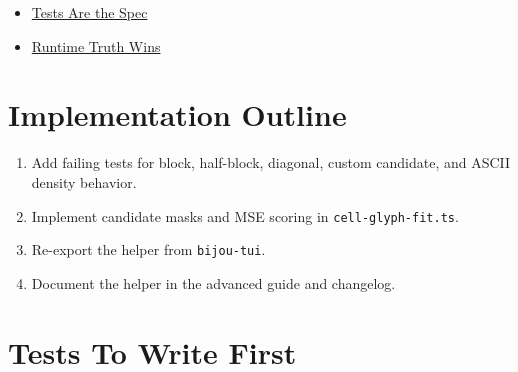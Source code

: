 \begin{itemize}
\tightlist
\item
  \href{https://github.com/flyingrobots/bijou/blob/cbd70612140e7a450d764b3c7be1c6af878b99bc/docs/invariants/tests-are-the-spec.md}{Tests Are the Spec}
\item
  \href{https://github.com/flyingrobots/bijou/blob/cbd70612140e7a450d764b3c7be1c6af878b99bc/docs/invariants/runtime-truth-wins.md}{Runtime Truth Wins}
\end{itemize}

\section{Implementation Outline}\label{record-160-implementation-outline}

\begin{enumerate}
\def\labelenumi{\arabic{enumi}.}
\tightlist
\item
  Add failing tests for block, half-block, diagonal, custom candidate, and ASCII density behavior.
\item
  Implement candidate masks and MSE scoring in \texttt{c\allowbreak{}e\allowbreak{}l\allowbreak{}l\allowbreak{}-\allowbreak{}g\allowbreak{}l\allowbreak{}y\allowbreak{}p\allowbreak{}h\allowbreak{}-\allowbreak{}f\allowbreak{}i\allowbreak{}t\allowbreak{}.\allowbreak{}t\allowbreak{}s}.
\item
  Re-export the helper from \texttt{b\allowbreak{}i\allowbreak{}j\allowbreak{}o\allowbreak{}u\allowbreak{}-\allowbreak{}t\allowbreak{}u\allowbreak{}i}.
\item
  Document the helper in the advanced guide and changelog.
\end{enumerate}

\section{Tests To Write First}\label{record-160-tests-to-write-first}

